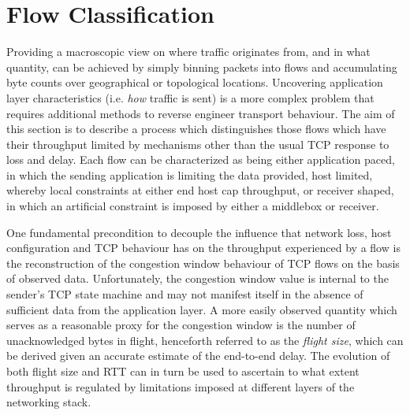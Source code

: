 \section{Flow Classification}
\label{section:rate:flow}

Providing a macroscopic view on where traffic originates from, and in what quantity, can be achieved by simply binning packets into flows and accumulating byte counts over geographical or topological locations. 
Uncovering application layer characteristics (i.e. \textit{how} traffic is sent) is a more complex problem that requires additional methods to reverse engineer transport behaviour.
The aim of this section is to describe a process which distinguishes those flows which have their throughput limited by mechanisms other than the usual \ac{TCP} response to loss and delay.
Each flow can be characterized as being either application paced, in which the sending application is limiting the data provided, host limited, whereby local constraints at either end host cap throughput, or receiver shaped, in which an artificial constraint is imposed by either a middlebox or receiver.

One fundamental precondition to decouple the influence that network loss, host configuration and \ac{TCP} behaviour has on the throughput experienced by a flow is the reconstruction of the congestion window behaviour of \ac{TCP} flows on the basis of observed data. 
Unfortunately, the congestion window value is internal to the sender's \ac{TCP} state machine and may not manifest itself in the absence of sufficient data from the application layer. 
A more easily observed quantity which serves as a reasonable proxy for the congestion window is the number of unacknowledged bytes in flight, henceforth referred to as the \textit{flight size}, which can be derived given an accurate estimate of the end-to-end delay.
The evolution of both flight size and \ac{RTT} can in turn be used to ascertain to what extent throughput is regulated by limitations imposed at different layers of the networking stack.

